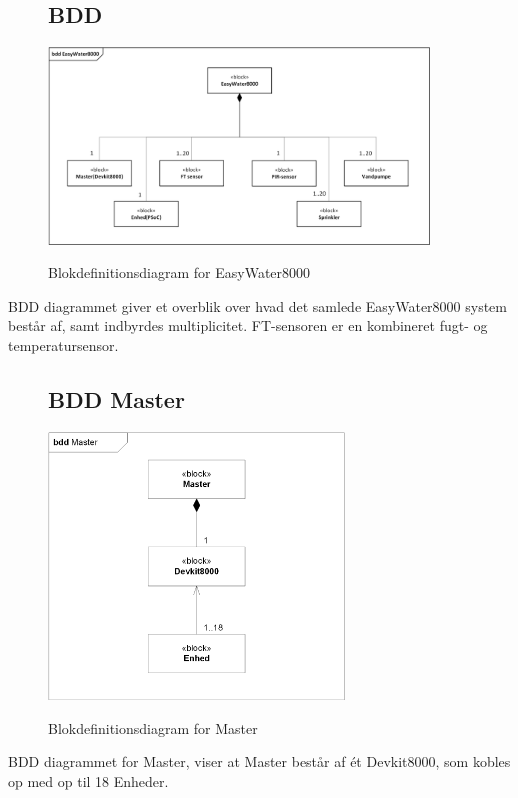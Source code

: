 \begin{figure}[H] \centering
\subsection{BDD}
{\includegraphics[width=0.9\textwidth]{filer/systemarkitektur/BDD}}
\caption{Blokdefinitionsdiagram for EasyWater8000}
\label{lab:bdd}
\raggedright
\end{figure}
BDD diagrammet giver et overblik over hvad det samlede EasyWater8000 system består af, samt indbyrdes multiplicitet. FT-sensoren er en kombineret fugt- og temperatursensor.  \newline \newline

\begin{figure}[H] \centering
\subsection{BDD Master}
{\includegraphics[width=0.7\textwidth]{filer/systemarkitektur/BDD_Master}}
\caption{Blokdefinitionsdiagram for Master}
\label{lab:bddmaster}
\raggedright
\end{figure}
BDD diagrammet for Master, viser at Master består af ét Devkit8000, som kobles op med op til 18 Enheder.

